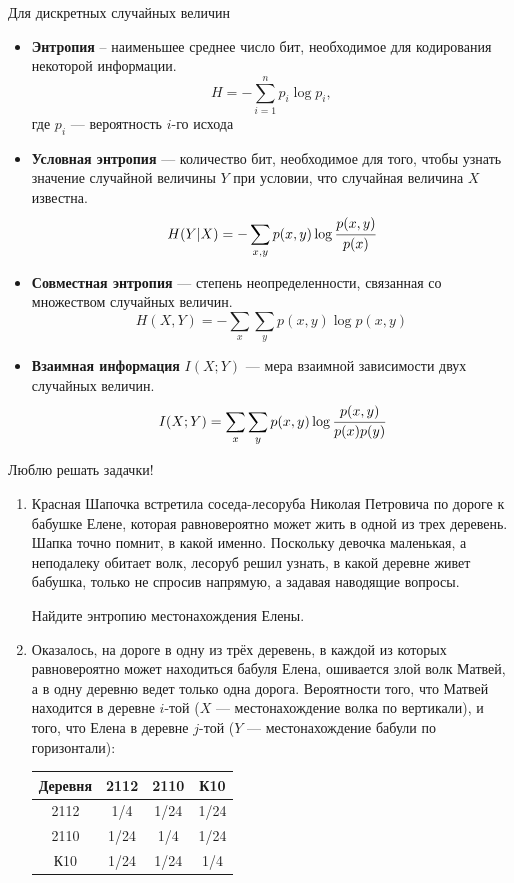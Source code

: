 \documentclass[final]{beamer}
\newlength{\onecolwid}
\begin{document}
\begin{frame}[t]
\begin{columns}[t]
\begin{column}{\onecolwid}
\begin{block}{Для дискретных случайных величин}
\begin{itemize}
	\item \textbf{Энтропия} -- наименьшее среднее число бит, необходимое для кодирования некоторой информации.
    \[H=-\sum\limits_{i=1}^n p_i\log p_i, \]
    где $p_i$ --- вероятность $i$-го исхода    
    \item \textbf{Условная энтропия} --- количество бит, необходимое для того, чтобы узнать значение случайной величины $Y$ при условии, что случайная величина $X$ известна.
    \[H(Y|X)=-\sum\limits_{x, y} p(x, y)\log \cfrac{p(x, y)}{p(x)} \]
    \item \textbf{Совместная энтропия} --- степень неопределенности, связанная со множеством случайных величин.
    \[H(X, Y)=-\sum\limits_{x}\sum\limits_{y} p(x, y)\log p(x ,y) \]
    \item \textbf{Взаимная информация} $I(X; Y)$ --- мера взаимной зависимости двух случайных величин.
    \[I(X; Y) = \sum\limits_{x}\sum\limits_{y} p(x, y)\log \cfrac{p(x, y)}{p(x)p(y)} \]
\end{itemize}
\end{block}


\begin{alertblock}{Люблю решать задачки!}
	\begin{enumerate}
		\item Красная Шапочка встретила соседа-лесоруба Николая Петровича по дороге к бабушке Елене, которая равновероятно может жить в одной из трех деревень. Шапка точно помнит, в какой именно. Поскольку девочка маленькая, а неподалеку обитает волк, лесоруб решил узнать, в какой деревне живет бабушка, только не спросив напрямую, а задавая наводящие вопросы. 

		Найдите энтропию местонахождения Елены. 
	
		\item Оказалось, на дороге в одну из трёх деревень, в каждой из которых равновероятно может находиться бабуля Елена, ошивается злой волк Матвей, а в одну деревню ведет только одна дорога. Вероятности того, что Матвей находится в деревне $i$-той ($X$ --- местонахождение волка по вертикали), и того, что Елена в деревне $j$-той ($Y$ --- местонахождение бабули по горизонтали):
		\begin{center}
			\begin{tabular}{c||c|c|c}
				Деревня & 2112 & 2110 & К10 \\
				\hline
				\hline
				2112 & 1/4 & 1/24 & 1/24 \\
				\hline
				2110 & 1/24 & 1/4 & 1/24 \\
				\hline
				К10 & 1/24 & 1/24 & 1/4 \\
			\end{tabular}
		\end{center}
		

\end{enumerate}
\end{alertblock}
\end{column}
\end{columns}
\end{frame}
\end{document}
